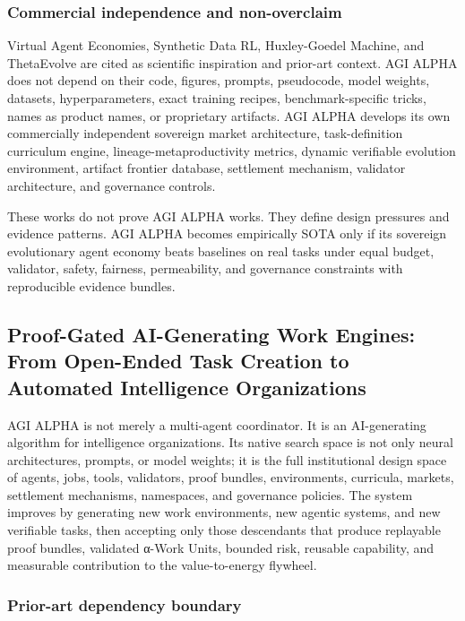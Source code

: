 \documentclass[
  11pt,
]{article}
\begin{document}
\subsubsection{Commercial independence and
non-overclaim}\label{commercial-independence-and-non-overclaim}

Virtual Agent Economies, Synthetic Data RL, Huxley-Goedel Machine, and
ThetaEvolve are cited as scientific inspiration and prior-art context.
AGI ALPHA does not depend on their code, figures, prompts, pseudocode,
model weights, datasets, hyperparameters, exact training recipes,
benchmark-specific tricks, names as product names, or proprietary
artifacts. AGI ALPHA develops its own commercially independent sovereign
market architecture, task-definition curriculum engine,
lineage-metaproductivity metrics, dynamic verifiable evolution
environment, artifact frontier database, settlement mechanism, validator
architecture, and governance controls.

These works do not prove AGI ALPHA works. They define design pressures
and evidence patterns. AGI ALPHA becomes empirically SOTA only if its
sovereign evolutionary agent economy beats baselines on real tasks under
equal budget, validator, safety, fairness, permeability, and governance
constraints with reproducible evidence bundles.

\subsection{Proof-Gated AI-Generating Work Engines: From Open-Ended Task
Creation to Automated Intelligence
Organizations}\label{proof-gated-ai-generating-work-engines-from-open-ended-task-creation-to-automated-intelligence-organizations}

AGI ALPHA is not merely a multi-agent coordinator. It is an
AI-generating algorithm for intelligence organizations. Its native
search space is not only neural architectures, prompts, or model
weights; it is the full institutional design space of agents, jobs,
tools, validators, proof bundles, environments, curricula, markets,
settlement mechanisms, namespaces, and governance policies. The system
improves by generating new work environments, new agentic systems, and
new verifiable tasks, then accepting only those descendants that produce
replayable proof bundles, validated α-Work Units, bounded risk, reusable
capability, and measurable contribution to the value-to-energy flywheel.

\subsubsection{Prior-art dependency
boundary}\label{prior-art-dependency-boundary-1}
\end{document}
